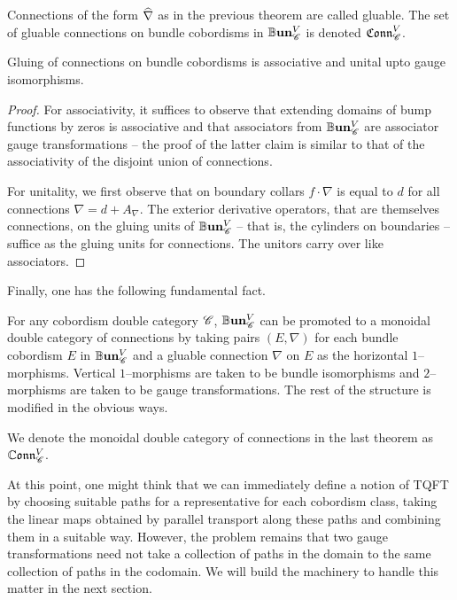 \begin{defn}
Connections of the form $\widehat{\nabla}$ as in the previous theorem are called
gluable. The set of gluable connections on bundle cobordisms in
$\mathbb{B}\textbf{un}^V_{\mathscr{C}}$ is denoted $\mathfrak{Conn}^V_{\mathscr{C}}$.
\end{defn}

\begin{cor}
Gluing of connections on bundle cobordisms is associative and unital upto gauge
isomorphisms.
\end{cor}
\begin{proof}
For associativity, it suffices to observe that extending domains of bump
functions by zeros is associative and that associators from $\mathbb{B}\textbf{un}^V_{\mathscr{C}}$
are associator gauge transformations -- the proof of the latter claim is similar
to that of the associativity of the disjoint union of connections.

For unitality, we first observe that on boundary collars $f \cdot \nabla$ is
equal to $d$ for all connections $\nabla = d + A_{\nabla}$. The exterior
derivative operators, that are themselves connections, on the gluing
units of $\mathbb{B}\textbf{un}^V_{\mathscr{C}}$ -- that is, the cylinders on boundaries -- suffice
as the gluing units for connections. The unitors carry over like associators.
\end{proof}

Finally, one has the following fundamental fact.

\begin{thm}
For any cobordism double category $\mathscr{C}$, $\mathbb{B}\textbf{un}^V_{\mathscr{C}}$ can be promoted to
a monoidal double category of connections by taking pairs $(E, \nabla)$ for each
bundle cobordism $E$ in $\mathbb{B}\textbf{un}^V_{\mathscr{C}}$ and a gluable connection $\nabla$ on
$E$ as the horizontal $1$--morphisms. Vertical $1$--morphisms are taken to be
bundle isomorphisms and $2$--morphisms are taken to be gauge transformations.
The rest of the structure is modified in the obvious ways.
\end{thm}

\begin{defn}
We denote the monoidal double category of connections in the last theorem as
$\mathbb{C}\mathfrak{onn}^V_{\mathscr{C}}$.
\end{defn}

At this point, one might think that we can immediately define a notion of TQFT
by choosing suitable paths for a representative for each cobordism class,
taking the linear maps obtained by parallel transport along these paths and
combining them in a suitable way. However, the problem remains that two gauge
transformations need not take a collection of paths in the domain to the same
collection of paths in the codomain. We will build the machinery to handle this
matter in the next section.

